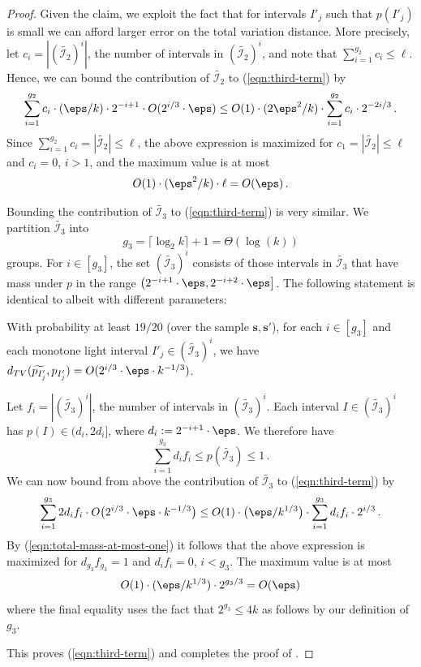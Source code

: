 \begin{proof}
Given the claim, we exploit the fact that for intervals $I'_j$ such that $p(I'_j)$ is small
we can afford larger error on the total variation distance.
More precisely, let {$c_i  = |(\widetilde{\mathcal{I}_2})^i|$}, the number of intervals in
{$(\widetilde{\mathcal{I}_2})^i$}, and note that {$\sum_{i=1}^{g_2} c_i \leq \ell$}.
Hence, we can bound the contribution of {$\widetilde{\mathcal{I}_2}$} to (\ref{eqn:third-term}) by
\begin{eqnarray*}
\sum_{i=1}^{g_2} c_i  \cdot (\eps/k) \cdot 2^{-i+1} \cdot  O(2^{i/3} \cdot \eps)
\leq O(1) \cdot (2\eps^2/k) \cdot \sum_{i=1}^{g_2} c_i \cdot 2^{-2i/3}\,.
\end{eqnarray*}
Since  {$\sum_{i=1}^{g_2} c_i = |\widetilde{\mathcal{I}_2}|   \leq \ell$}, the above expression is maximized for
{$c_1= |\widetilde{\mathcal{I}_2}| \le \ell$ and $c_i = 0$, $i >1$,} and the maximum value is at most
{$$O(1) \cdot (\eps^2/k) \cdot \ell = O(\eps)\,.$$} 
{Bounding the contribution of $\widetilde{\mathcal{I}_3}$ to (\ref{eqn:third-term}) is very similar.
We partition
$\widetilde{\mathcal{I}_3}$ into
\[
g_3 = \lceil \log_2 k \rceil +1 =
\Theta (\log(k))
\]
groups.
For $i \in [{g_3}]$, the set $(\widetilde{\mathcal{I}_3})^i$
consists of those intervals in  $\widetilde{\mathcal{I}_3}$
that have mass under $p$ in the range $\left( 2^{-i+1} \cdot \eps, 2^{-i+2} \cdot \eps \right]$.
The following statement is identical to  
albeit with different parameters:
\begin{claim} \label{claim:heavy}
With probability at least $19/20$ (over the sample $\mathbf{s}, \mathbf{s'}$),
for each $i \in [g_3]$ and each monotone light interval $I'_j \in (\widetilde{\mathcal{I}_3})^i${,} we have
$d_{TV}(\widetilde{p_{I'_j}},p_{I'_j}) = O(2^{i/3} \cdot \eps \cdot k^{-1/3})$.
\end{claim}
Let {$f_i  = |(\widetilde{\mathcal{I}_3})^i|$}, the number of intervals in $(\widetilde{\mathcal{I}_3})^i$. 
Each interval $I \in (\widetilde{\mathcal{I}_3})^i$ has $p(I) \in (d_i, 2d_i]$, where $d_i : = 2^{-i+1} \cdot \eps$.
We therefore have
\begin{equation} \label{eqn:total-mass-at-most-one}
\sum_{i=1}^{g_3} d_i  {f_i} \le p(\widetilde{\mathcal{I}_3}) \le 1\,.
\end{equation}
We can now bound from above the contribution of $\widetilde{\mathcal{I}_3}$ to (\ref{eqn:third-term}) by
\begin{eqnarray*}
\sum_{i=1}^{g_3} 2d_i  {f_i} \cdot  O\bigl(2^{i/3} \cdot \eps \cdot k^{-1/3}\bigr)
\leq O(1) \cdot \bigl(\eps/k^{1/3}\bigr) \cdot \sum_{i=1}^{g_3} d_i  {f_i} \cdot 2^{i/3}\,.
\end{eqnarray*}
By (\ref{eqn:total-mass-at-most-one}) it follows that the above expression is maximized for
$d_{g_3}  {f_{g_3}} = 1$ and $d_i  {f_i}= 0$, $i <g_3$. The maximum value is at most
$$O(1) \cdot (\eps/k^{1/3}) \cdot 2^{g_3/3} = O(\eps)$$
where the final equality uses the fact that $2^{g_3} \le 4k$ as follows by our definition of $g_3$. 
}
This proves  (\ref{eqn:third-term}) and completes the proof of .
\end{proof}


